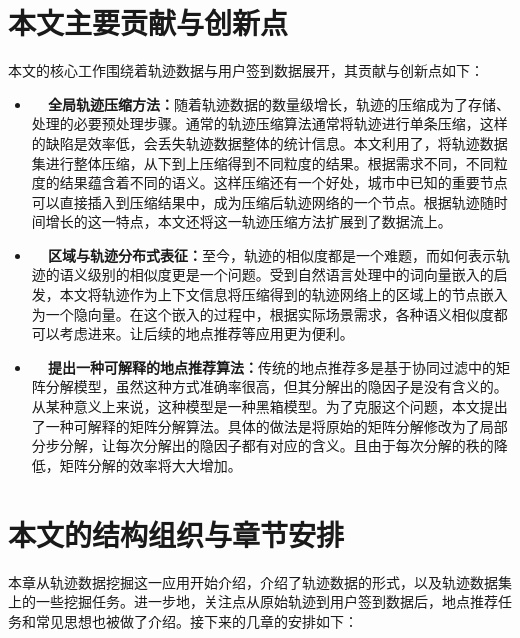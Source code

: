 \section{本文主要贡献与创新点}
本文的核心工作围绕着轨迹数据与用户签到数据展开，其贡献与创新点如下：
\begin{itemize}
  \item \textbf{~~全局轨迹压缩方法：}随着轨迹数据的数量级增长，轨迹的压缩成为了存储、处理的必要预处理步骤。通常的轨迹压缩算法通常将轨迹进行单条压缩，这样的缺陷是效率低，会丢失轨迹数据整体的统计信息。本文利用了，将轨迹数据集进行整体压缩，从下到上压缩得到不同粒度的结果。根据需求不同，不同粒度的结果蕴含着不同的语义。这样压缩还有一个好处，城市中已知的重要节点可以直接插入到压缩结果中，成为压缩后轨迹网络的一个节点。根据轨迹随时间增长的这一特点，本文还将这一轨迹压缩方法扩展到了数据流上。
  \item \textbf{~~区域与轨迹分布式表征：}至今，轨迹的相似度都是一个难题，而如何表示轨迹的语义级别的相似度更是一个问题。受到自然语言处理中的词向量嵌入的启发，本文将轨迹作为上下文信息将压缩得到的轨迹网络上的区域上的节点嵌入为一个隐向量。在这个嵌入的过程中，根据实际场景需求，各种语义相似度都可以考虑进来。让后续的地点推荐等应用更为便利。
  \item \textbf{~~提出一种可解释的地点推荐算法：}传统的地点推荐多是基于协同过滤中的矩阵分解模型，虽然这种方式准确率很高，但其分解出的隐因子是没有含义的。从某种意义上来说，这种模型是一种黑箱模型。为了克服这个问题，本文提出了一种可解释的矩阵分解算法。具体的做法是将原始的矩阵分解修改为了局部分步分解，让每次分解出的隐因子都有对应的含义。且由于每次分解的秩的降低，矩阵分解的效率将大大增加。
\end{itemize}

\section{本文的结构组织与章节安排}
本章从轨迹数据挖掘这一应用开始介绍，介绍了轨迹数据的形式，以及轨迹数据集上的一些挖掘任务。进一步地，关注点从原始轨迹到用户签到数据后，地点推荐任务和常见思想也被做了介绍。接下来的几章的安排如下：

